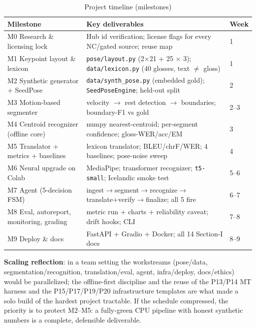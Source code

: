 \documentclass[12pt,a4paper]{article}
\begin{document}
\begin{table}[H]
\centering
\caption{Project timeline (milestones)}
\small
\begin{tabularx}{\linewidth}{@{} l L l @{}}
\toprule
\textbf{Milestone} & \textbf{Key deliverables} & \textbf{Week} \\
\midrule
M0 Research \& licensing lock & Hub id verification; license flags for every NC/gated source; reuse map & 1 \\
M1 Keypoint layout \& lexicon & \texttt{pose/layout.py} (2$\times$21 + 25 $\times$ 3); \texttt{data/lexicon.py} (40 glosses, text $\neq$ gloss) & 1 \\
M2 Synthetic generator + SeedPose & \texttt{data/synth\_pose.py} (embedded gold); \texttt{SeedPoseEngine}; held-out split & 2 \\
M3 Motion-based segmenter & velocity $\rightarrow$ rest detection $\rightarrow$ boundaries; boundary-F1 vs gold & 2--3 \\
M4 Centroid recognizer (offline core) & numpy nearest-centroid; per-segment confidence; gloss-WER/acc/EM & 3 \\
M5 Translator + metrics + baselines & lexicon translator; BLEU/chrF/WER; 4 baselines; pose-noise sweep & 4 \\
M6 Neural upgrade on Colab & MediaPipe; transformer recognizer; \texttt{t5-small}; Icelandic smoke test & 5--6 \\
M7 Agent (5-decision FSM) & ingest$\rightarrow$segment$\rightarrow$recognize$\rightarrow$translate+verify$\rightarrow$finalize; all 5 fire & 6--7 \\
M8 Eval, autoreport, monitoring, grading & metric run + charts + reliability caveat; drift hooks; CLI & 7--8 \\
M9 Deploy \& docs & FastAPI + Gradio + Docker; all 14 Section-I docs & 8--9 \\
\bottomrule
\end{tabularx}
\end{table}

\textbf{Scaling reflection}: in a team setting the workstreams (pose/data, segmentation/recognition, translation/eval, agent, infra/deploy, docs/ethics) would be parallelized; the offline-first discipline and the reuse of the P13/P14 MT harness and the P15/P17/P19/P20 infrastructure templates are what made a solo build of the hardest project tractable. If the schedule compressed, the priority is to protect M2--M5: a fully-green CPU pipeline with honest synthetic numbers is a complete, defensible deliverable.
\end{document}

